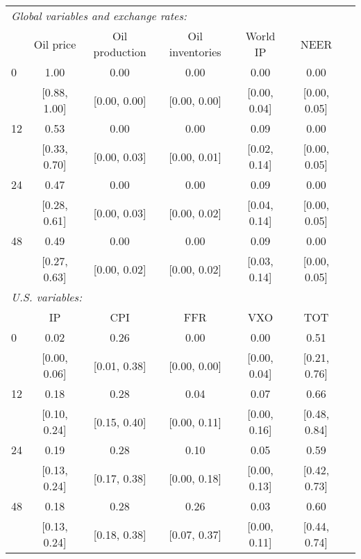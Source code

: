 \begin{tabular}{lcccccc}\toprule\midrule  
\multicolumn{6}{l}{\textit{Global variables and exchange rates:}} \\ 
 & Oil price & Oil production & Oil inventories & World IP & NEER  \\ \midrule  
 0 &     1.00 &     0.00 &     0.00 &     0.00 &     0.00  \\  
 & [0.88,    1.00] & [0.00,    0.00] & [0.00,    0.00] & [0.00,    0.04] & [0.00,    0.05] \\  
 12 &     0.53 &     0.00 &     0.00 &     0.09 &     0.00  \\  
 & [0.33,    0.70] & [0.00,    0.03] & [0.00,    0.01] & [0.02,    0.14] & [0.00,    0.05] \\  
 24 &     0.47 &     0.00 &     0.00 &     0.09 &     0.00  \\  
 & [0.28,    0.61] & [0.00,    0.03] & [0.00,    0.02] & [0.04,    0.14] & [0.00,    0.05] \\  
 48 &     0.49 &     0.00 &     0.00 &     0.09 &     0.00  \\  
 & [0.27,    0.63] & [0.00,    0.02] & [0.00,    0.02] & [0.03,    0.14] & [0.00,    0.05] \\[2ex] \midrule  
\multicolumn{6}{l}{\textit{U.S. variables:}} \\ 
 & IP & CPI & FFR & VXO & TOT  \\ \midrule  
 0 &     0.02 &     0.26 &     0.00 &     0.00 &     0.51  \\  
 & [0.00,    0.06] & [0.01,    0.38] & [0.00,    0.00] & [0.00,    0.04] & [0.21,    0.76] \\  
 12 &     0.18 &     0.28 &     0.04 &     0.07 &     0.66  \\  
 & [0.10,    0.24] & [0.15,    0.40] & [0.00,    0.11] & [0.00,    0.16] & [0.48,    0.84] \\  
 24 &     0.19 &     0.28 &     0.10 &     0.05 &     0.59  \\  
 & [0.13,    0.24] & [0.17,    0.38] & [0.00,    0.18] & [0.00,    0.13] & [0.42,    0.73] \\  
 48 &     0.18 &     0.28 &     0.26 &     0.03 &     0.60  \\  
 & [0.13,    0.24] & [0.18,    0.38] & [0.07,    0.37] & [0.00,    0.11] & [0.44,    0.74] \\  
\midrule\bottomrule 
\end{tabular}
